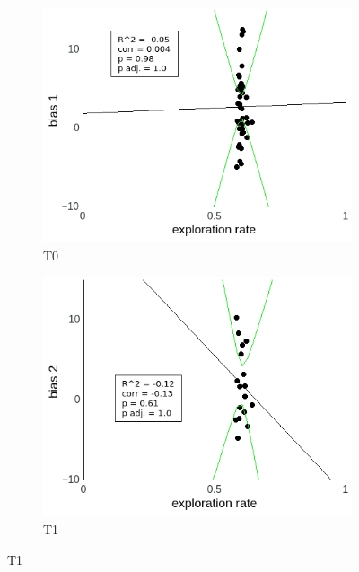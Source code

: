 \documentclass[a4paper]{scrreprt}
\begin{document}
\begin{figure}
\centering
\begin{subfigure}[b]{0.49\textwidth}
        \includegraphics[width=\textwidth]{figs/sec3/temp/tempno_diff_1_mod2dat.jpeg}
        \caption{T0}
    \end{subfigure}
    \begin{subfigure}[b]{0.49\textwidth}
        \includegraphics[width=\textwidth]{figs/sec3/temp/tempno_diff_2_mod2dat.jpeg}
        \caption{T1}
    \end{subfigure}


\end{figure}
\end{document}
